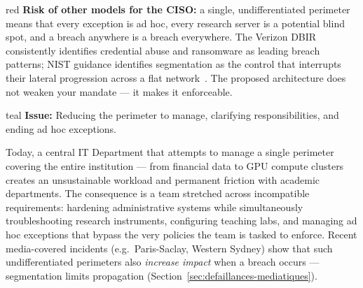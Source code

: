\begin{stakeholderbox}{red}
\medskip
\textbf{Risk of other models for the CISO:} a single,
undifferentiated perimeter means that every exception is ad hoc,
every research server is a potential blind spot, and a breach
anywhere is a breach everywhere. The Verizon
DBIR~\cite{verizon-dbir2024} consistently identifies credential
abuse and ransomware as leading breach patterns; NIST guidance
identifies segmentation as the control that interrupts their
lateral progression across a flat network~\cite{nist-sp800-215}.
The proposed architecture does not weaken your mandate ---
it makes it enforceable.
\end{stakeholderbox}

\bigskip

\begin{stakeholderbox}{teal}
\textbf{Issue:} Reducing the perimeter to manage, clarifying
responsibilities, and ending ad hoc exceptions.

\medskip
Today, a central IT Department that attempts to manage a single
perimeter covering the entire institution --- from financial data to
GPU compute clusters creates an unsustainable workload and
permanent friction with academic departments.
The consequence is a team stretched across incompatible
requirements: hardening administrative systems while
simultaneously troubleshooting research instruments,
configuring teaching labs, and managing ad hoc exceptions
that bypass the very policies the team is tasked to enforce.
Recent media-covered
incidents (e.g.\ Paris-Saclay, Western Sydney) show that such
undifferentiated perimeters also \emph{increase impact} when a breach
occurs --- segmentation limits propagation (Section~\ref{sec:defaillances-mediatiques}).


\end{stakeholderbox}
